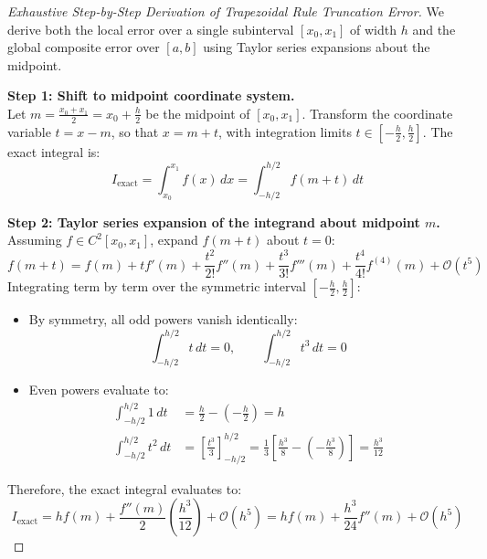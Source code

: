 \begin{proof}[Exhaustive Step-by-Step Derivation of Trapezoidal Rule Truncation Error]
We derive both the local error over a single subinterval $[x_0, x_1]$ of width $h$ and the global composite error over $[a, b]$ using Taylor series expansions about the midpoint.

\medskip
\noindent\textbf{Step 1: Shift to midpoint coordinate system.} \\
Let $m = \frac{x_0 + x_1}{2} = x_0 + \frac{h}{2}$ be the midpoint of $[x_0, x_1]$. Transform the coordinate variable $t = x - m$, so that $x = m + t$, with integration limits $t \in \left[-\frac{h}{2}, \frac{h}{2}\right]$.
The exact integral is:
\begin{equation}
    I_{\text{exact}} = \int_{x_0}^{x_1} f(x) \, dx = \int_{-h/2}^{h/2} f(m + t) \, dt
\end{equation}

\noindent\textbf{Step 2: Taylor series expansion of the integrand about midpoint $m$.} \\
Assuming $f \in C^2[x_0, x_1]$, expand $f(m + t)$ about $t = 0$:
\begin{equation}
    f(m + t) = f(m) + t f'(m) + \frac{t^2}{2!} f''(m) + \frac{t^3}{3!} f'''(m) + \frac{t^4}{4!} f^{(4)}(m) + \mathcal{O}(t^5)
\end{equation}
Integrating term by term over the symmetric interval $\left[-\frac{h}{2}, \frac{h}{2}\right]$:
\begin{itemize}[noitemsep]
    \item By symmetry, all odd powers vanish identically:
    \begin{equation}
        \int_{-h/2}^{h/2} t \, dt = 0, \qquad \int_{-h/2}^{h/2} t^3 \, dt = 0
    \end{equation}
    \item Even powers evaluate to:
    \begin{align}
        \int_{-h/2}^{h/2} 1 \, dt &= \frac{h}{2} - \left(-\frac{h}{2}\right) = h \\
        \int_{-h/2}^{h/2} t^2 \, dt &= \left[ \frac{t^3}{3} \right]_{-h/2}^{h/2} = \frac{1}{3}\left[ \frac{h^3}{8} - \left(-\frac{h^3}{8}\right) \right] = \frac{h^3}{12}
    \end{align}
\end{itemize}
Therefore, the exact integral evaluates to:
\begin{equation}
    \label{eq:trap_exact_midpoint}
    I_{\text{exact}} = h f(m) + \frac{f''(m)}{2} \left( \frac{h^3}{12} \right) + \mathcal{O}(h^5) = h f(m) + \frac{h^3}{24} f''(m) + \mathcal{O}(h^5)
\end{equation}


\end{proof}
